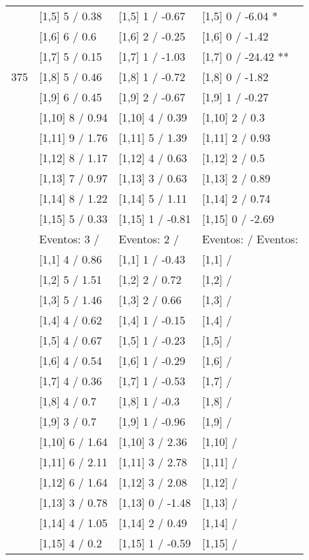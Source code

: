 \begin{table}
\begin{tabular}[t]{llll}
 & {}[1,5] 5  / 0.38 & {}[1,5] 1  / -0.67 & {}[1,5] 0  / -6.04 *\\
 & {}[1,6] 6  / 0.6 & {}[1,6] 2  / -0.25 & {}[1,6] 0  / -1.42\\
 & {}[1,7] 5  / 0.15 & {}[1,7] 1  / -1.03 & {}[1,7] 0  / -24.42 **\\
375 & {}[1,8] 5  / 0.46 & {}[1,8] 1  / -0.72 & {}[1,8] 0  / -1.82\\
\addlinespace
 & {}[1,9] 6  / 0.45 & {}[1,9] 2  / -0.67 & {}[1,9] 1  / -0.27\\
 & {}[1,10] 8  / 0.94 & {}[1,10] 4  / 0.39 & {}[1,10] 2  / 0.3\\
 & {}[1,11] 9  / 1.76 & {}[1,11] 5  / 1.39 & {}[1,11] 2  / 0.93\\
 & {}[1,12] 8  / 1.17 & {}[1,12] 4  / 0.63 & {}[1,12] 2  / 0.5\\
 & {}[1,13] 7  / 0.97 & {}[1,13] 3  / 0.63 & {}[1,13] 2  / 0.89\\
\addlinespace
 & {}[1,14] 8  / 1.22 & {}[1,14] 5  / 1.11 & {}[1,14] 2  / 0.74\\
 & {}[1,15] 5  / 0.33 & {}[1,15] 1  / -0.81 & {}[1,15] 0  / -2.69\\
 & Eventos:  3 / & Eventos:  2 / & Eventos:   / Eventos:\\
 & {}[1,1] 4  / 0.86 & {}[1,1] 1  / -0.43 & {}[1,1]  /\\
 & {}[1,2] 5  / 1.51 & {}[1,2] 2  / 0.72 & {}[1,2]  /\\
\addlinespace
 & {}[1,3] 5  / 1.46 & {}[1,3] 2  / 0.66 & {}[1,3]  /\\
 & {}[1,4] 4  / 0.62 & {}[1,4] 1  / -0.15 & {}[1,4]  /\\
 & {}[1,5] 4  / 0.67 & {}[1,5] 1  / -0.23 & {}[1,5]  /\\
 & {}[1,6] 4  / 0.54 & {}[1,6] 1  / -0.29 & {}[1,6]  /\\
 & {}[1,7] 4  / 0.36 & {}[1,7] 1  / -0.53 & {}[1,7]  /\\
\addlinespace
500 & {}[1,8] 4  / 0.7 & {}[1,8] 1  / -0.3 & {}[1,8]  /\\
 & {}[1,9] 3  / 0.7 & {}[1,9] 1  / -0.96 & {}[1,9]  /\\
 & {}[1,10] 6  / 1.64 & {}[1,10] 3  / 2.36 & {}[1,10]  /\\
 & {}[1,11] 6  / 2.11 & {}[1,11] 3  / 2.78 & {}[1,11]  /\\
 & {}[1,12] 6  / 1.64 & {}[1,12] 3  / 2.08 & {}[1,12]  /\\
\addlinespace
 & {}[1,13] 3  / 0.78 & {}[1,13] 0  / -1.48 & {}[1,13]  /\\
 & {}[1,14] 4  / 1.05 & {}[1,14] 2  / 0.49 & {}[1,14]  /\\
 & {}[1,15] 4  / 0.2 & {}[1,15] 1  / -0.59 & {}[1,15]  /\\
\bottomrule
\end{tabular}
\end{table}
